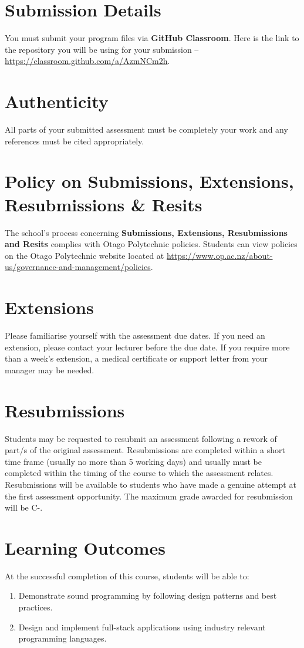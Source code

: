 \documentclass{article}
\begin{document}
\section*{Submission Details}
You must submit your program files via \textbf{GitHub Classroom}. Here is the link to the repository you will be using for your submission – \href{https://classroom.github.com/a/AzmNCm2h}{https://classroom.github.com/a/AzmNCm2h}.

\section*{Authenticity}
All parts of your submitted assessment must be completely your work and any references must be cited appropriately.

\section*{Policy on Submissions, Extensions, Resubmissions \& Resits}
The school's process concerning \textbf{Submissions, Extensions, Resubmissions and Resits} complies with Otago Polytechnic policies. Students can view policies on the Otago Polytechnic website located at \href{https://www.op.ac.nz/about-us/governance-and-management/policies}{https://www.op.ac.nz/about-us/governance-and-management/policies}.

\section*{Extensions}
Please familiarise yourself with the assessment due dates. If you need an extension, please contact your lecturer before the due date. If you require more than a week's extension, a medical certificate or support letter from your manager may be needed.

\section*{Resubmissions}
Students may be requested to resubmit an assessment following a rework of part/s of the original assessment. Resubmissions are completed within a short time frame (usually no more than 5 working days) and usually must be completed within the timing of the course to which the assessment relates. Resubmissions will be available to students who have made a genuine attempt at the first assessment opportunity. The maximum grade awarded for resubmission will be C-.

\section*{Learning Outcomes}
At the successful completion of this course, students will be able to:
\begin{enumerate}
	\item Demonstrate sound programming by following design patterns and best practices.
	\item Design and implement full-stack applications using industry relevant programming languages.
\end{enumerate}
\end{document}
